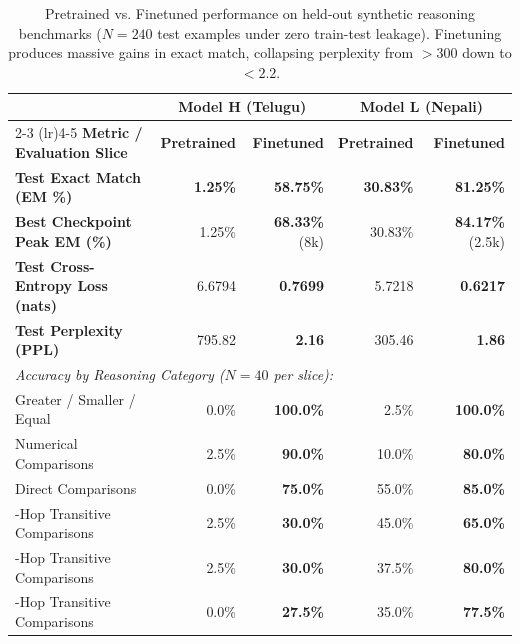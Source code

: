 \documentclass[8pt]{article}
\begin{document}
\begin{table}[H]
    \centering
    \small
    \setlength{\tabcolsep}{4.5pt}
    \begin{tabular}{lrrrr}
        \toprule
        & \multicolumn{2}{c}{\textbf{Model H (Telugu)}} & \multicolumn{2}{c}{\textbf{Model L (Nepali)}} \\
        \cmidrule(lr){2-3} \cmidrule(lr){4-5}
        \textbf{Metric / Evaluation Slice} & \textbf{Pretrained} & \textbf{Finetuned} & \textbf{Pretrained} & \textbf{Finetuned} \\
        \midrule
        \textbf{Test Exact Match (EM \%)} & \textbf{1.25\%} & \textbf{58.75\%} & \textbf{30.83\%} & \textbf{81.25\%} \\
        \textbf{Best Checkpoint Peak EM (\%)} & 1.25\% & \textbf{68.33\%} (8k) & 30.83\% & \textbf{84.17\%} (2.5k) \\
        \textbf{Test Cross-Entropy Loss (nats)} & 6.6794 & \textbf{0.7699} & 5.7218 & \textbf{0.6217} \\
        \textbf{Test Perplexity (PPL)} & 795.82 & \textbf{2.16} & 305.46 & \textbf{1.86} \\
        \midrule
        \multicolumn{5}{l}{\textit{Accuracy by Reasoning Category ($N = 40$ per slice):}} \\
        \quad Greater / Smaller / Equal & 0.0\% & \textbf{100.0\%} & 2.5\% & \textbf{100.0\%} \\
        \quad Numerical Comparisons & 2.5\% & \textbf{90.0\%} & 10.0\% & \textbf{80.0\%} \\
        \quad Direct Comparisons & 0.0\% & \textbf{75.0\%} & 55.0\% & \textbf{85.0\%} \\
        \quad 2-Hop Transitive Comparisons & 2.5\% & \textbf{30.0\%} & 45.0\% & \textbf{65.0\%} \\
        \quad 3-Hop Transitive Comparisons & 2.5\% & \textbf{30.0\%} & 37.5\% & \textbf{80.0\%} \\
        \quad 4-Hop Transitive Comparisons & 0.0\% & \textbf{27.5\%} & 35.0\% & \textbf{77.5\%} \\
        \bottomrule
    \end{tabular}
    \caption{Pretrained vs. Finetuned performance on held-out synthetic reasoning benchmarks ($N = 240$ test examples under zero train-test leakage). Finetuning produces massive gains in exact match, collapsing perplexity from $>300$ down to $<2.2$.}
    \label{tab:reasoning_master_eval}
\end{table}
\end{document}
